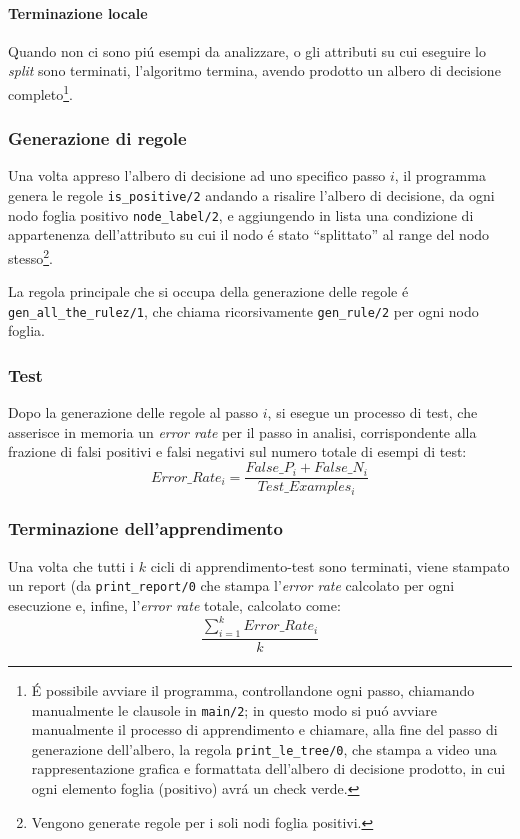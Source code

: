 \documentclass[preprint]{acm_proc_article-sp}
\begin{document}
\paragraph{Terminazione locale}
Quando non ci sono pi\'u esempi da analizzare, o gli attributi su cui eseguire lo \textit{split} sono terminati, l'algoritmo termina, avendo prodotto un albero di decisione completo\footnote{\'E possibile avviare il programma, controllandone ogni passo, chiamando manualmente le clausole in \verb|main/2|; in questo modo si pu\'o avviare manualmente il processo di apprendimento e chiamare, alla fine del passo di generazione dell'albero, la regola \verb|print_le_tree/0|, che stampa a video una rappresentazione grafica e formattata dell'albero di decisione prodotto, in cui ogni elemento foglia (positivo) avr\'a un check verde.}.

\subsubsection{Generazione di regole}
Una volta appreso l'albero di decisione ad uno specifico passo $i$, il programma genera le regole \verb|is_positive/2| andando a risalire l'albero di decisione, da ogni nodo foglia positivo \verb|node_label/2|, e aggiungendo in lista una condizione di appartenenza dell'attributo su cui il nodo \'e stato ``splittato'' al range del nodo stesso\footnote{Vengono generate regole per i soli nodi foglia positivi.}.

La regola principale che si occupa della generazione delle regole \'e \verb|gen_all_the_rulez/1|, che chiama ricorsivamente \verb|gen_rule/2| per ogni nodo foglia.

\subsubsection{Test}
Dopo la generazione delle regole al passo $i$, si esegue un processo di test, che asserisce in memoria un \textit{error rate} per il passo in analisi, corrispondente alla frazione di falsi positivi e falsi negativi sul numero totale di esempi di test:
\[ Error\_Rate_i = \frac{False\_P_i + False\_N_i}{Test\_Examples_i} \]

\subsubsection{Terminazione dell'apprendimento}
Una volta che tutti i $k$ cicli di apprendimento-test sono terminati, viene stampato un report (da \verb|print_report/0| che stampa l'\textit{error rate} calcolato per ogni esecuzione e, infine, l'\textit{error rate} totale, calcolato come:
\[ \frac{\sum_{i=1}^k Error\_Rate_i}{k} \]
\end{document}
